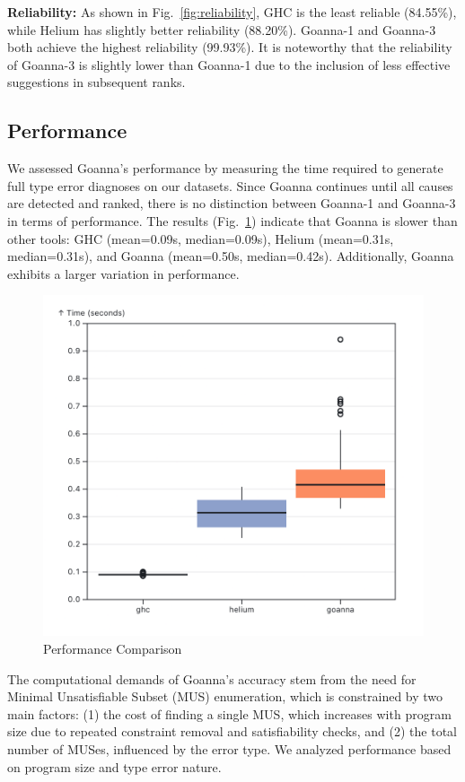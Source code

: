 \documentclass[pdflatex,sn-mathphys-num]{sn-jnl}%
\begin{document}
\textbf{Reliability:} As shown in Fig.~\ref{fig:reliability}, GHC is the least reliable (84.55\%), while Helium has slightly better reliability (88.20\%). Goanna-1 and Goanna-3 both achieve the highest reliability (99.93\%). It is noteworthy that the reliability of Goanna-3 is slightly lower than Goanna-1 due to the inclusion of less effective suggestions in subsequent ranks.

\subsection{Performance} \label{sub:eval-performance}

We assessed Goanna's performance by measuring the time required to generate full type error diagnoses on our datasets. Since Goanna continues until all causes are detected and ranked, there is no distinction between Goanna-1 and Goanna-3 in terms of performance. The results (Fig.~\ref{fig:performance}) indicate that Goanna is slower than other tools: GHC (mean=0.09s, median=0.09s), Helium (mean=0.31s, median=0.31s), and Goanna (mean=0.50s, median=0.42s). Additionally, Goanna exhibits a larger variation in performance.

\begin{figure}[ht!]
    \centering
    \includegraphics[width=0.7\linewidth]{images/performance-overall.png}
    \caption{Performance Comparison}
    \label{fig:performance}
\end{figure}

The computational demands of Goanna's accuracy stem from the need for Minimal Unsatisfiable Subset (MUS) enumeration, which is constrained by two main factors: (1) the cost of finding a single MUS, which increases with program size due to repeated constraint removal and satisfiability checks, and (2) the total number of MUSes, influenced by the error type. We analyzed performance based on program size and type error nature.
\end{document}
